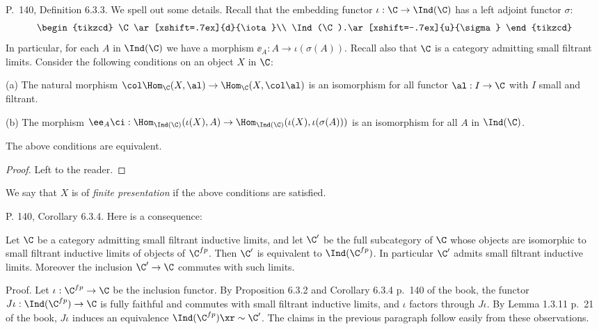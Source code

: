 \documentclass[12pt]{article}
\theoremstyle{remark}
\theoremstyle{definition}
\begin{document}
\begin{s} 
P.~140, Definition 6.3.3. We spell out some details. Recall that the embedding functor $\iota:\C\to\Ind(\C)$ has a left adjoint functor $\sigma$:
$$
\begin{tikzcd}
\C\ar[xshift=.7ex]{d}{\iota}\\ 
\Ind(\C).\ar[xshift=-.7ex]{u}{\sigma}
\end{tikzcd}
$$ 
In particular, for each $A$ in $\Ind(\C)$ we have a morphism $\ee_A:A\to\iota(\sigma(A))$. Recall also that $\C$ is a category admitting small filtrant limits. Consider the following conditions on an object $X$ in $\C$:

\nn(a) The natural morphism $\col\Hom_\C(X,\al)\to\Hom_\C(X,\col\al)$ is an isomorphism for all functor $\al:I\to\C$ with $I$ small and filtrant.

\nn(b) The morphism $\ee_A\ci:\Hom_{\Ind(\C)}(\iota(X),A)\to\Hom_{\Ind(\C)}(\iota(X),\iota(\sigma(A)))$ is an isomorphism for all $A$ in $\Ind(\C)$.
\begin{lem}
The above conditions are equivalent.
\end{lem}
\begin{proof}
Left to the reader.
\end{proof} 
\begin{df}
We say that $X$ is of \emph{finite presentation} if the above conditions are satisfied.
\end{df}
\end{s}

%

\begin{s}
P. 140, Corollary 6.3.4. Here is a consequence:

Let $\C$ be a category admitting small filtrant inductive limits, and let $\C'$ be the full subcategory of $\C$ whose objects are isomorphic to small filtrant inductive limits of objects of $\C^{fp}$. Then $\C'$ is equivalent to $\Ind(\C^{fp})$. In particular $\C'$ admits small filtrant inductive limits. Moreover the inclusion $\C'\to\C$ commutes with such limits.

Proof. Let $\iota:\C^{fp}\to\C$ be the inclusion functor. By Proposition 6.3.2 and Corollary 6.3.4 p.~140 of the book, the functor $J\iota:\Ind(\C^{fp})\to\C$ is fully faithful and commutes with small filtrant inductive limits, and $\iota$ factors through $J\iota$. By Lemma 1.3.11 p.~21 of the book, $J\iota$ induces an equivalence $\Ind(\C^{fp})\xr\sim\C'$. The claims in the previous paragraph follow easily from these observations.
\end{s}
\end{document}
